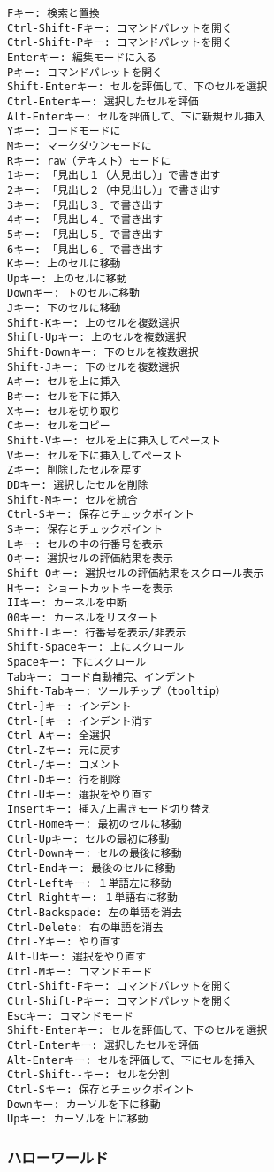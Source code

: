\documentclass[11pt]{article}
\begin{document}
    \begin{verbatim}
Fキー: 検索と置換
Ctrl-Shift-Fキー: コマンドパレットを開く
Ctrl-Shift-Pキー: コマンドパレットを開く
Enterキー: 編集モードに入る
Pキー: コマンドパレットを開く
Shift-Enterキー: セルを評価して、下のセルを選択
Ctrl-Enterキー: 選択したセルを評価
Alt-Enterキー: セルを評価して、下に新規セル挿入
Yキー: コードモードに
Mキー: マークダウンモードに
Rキー: raw（テキスト）モードに
1キー: 「見出し１（大見出し）」で書き出す
2キー: 「見出し２（中見出し）」で書き出す
3キー: 「見出し３」で書き出す
4キー: 「見出し４」で書き出す
5キー: 「見出し５」で書き出す
6キー: 「見出し６」で書き出す
Kキー: 上のセルに移動
Upキー: 上のセルに移動
Downキー: 下のセルに移動
Jキー: 下のセルに移動
Shift-Kキー: 上のセルを複数選択
Shift-Upキー: 上のセルを複数選択
Shift-Downキー: 下のセルを複数選択
Shift-Jキー: 下のセルを複数選択
Aキー: セルを上に挿入
Bキー: セルを下に挿入
Xキー: セルを切り取り
Cキー: セルをコピー
Shift-Vキー: セルを上に挿入してペースト
Vキー: セルを下に挿入してペースト
Zキー: 削除したセルを戻す
DDキー: 選択したセルを削除
Shift-Mキー: セルを統合
Ctrl-Sキー: 保存とチェックポイント
Sキー: 保存とチェックポイント
Lキー: セルの中の行番号を表示
Oキー: 選択セルの評価結果を表示
Shift-Oキー: 選択セルの評価結果をスクロール表示
Hキー: ショートカットキーを表示
IIキー: カーネルを中断
00キー: カーネルをリスタート
Shift-Lキー: 行番号を表示/非表示
Shift-Spaceキー: 上にスクロール
Spaceキー: 下にスクロール
Tabキー: コード自動補完、インデント
Shift-Tabキー: ツールチップ（tooltip）
Ctrl-]キー: インデント
Ctrl-[キー: インデント消す
Ctrl-Aキー: 全選択
Ctrl-Zキー: 元に戻す
Ctrl-/キー: コメント
Ctrl-Dキー: 行を削除
Ctrl-Uキー: 選択をやり直す
Insertキー: 挿入/上書きモード切り替え
Ctrl-Homeキー: 最初のセルに移動
Ctrl-Upキー: セルの最初に移動
Ctrl-Downキー: セルの最後に移動
Ctrl-Endキー: 最後のセルに移動
Ctrl-Leftキー: １単語左に移動
Ctrl-Rightキー: １単語右に移動
Ctrl-Backspade: 左の単語を消去
Ctrl-Delete: 右の単語を消去
Ctrl-Yキー: やり直す
Alt-Uキー: 選択をやり直す
Ctrl-Mキー: コマンドモード
Ctrl-Shift-Fキー: コマンドパレットを開く
Ctrl-Shift-Pキー: コマンドパレットを開く
Escキー: コマンドモード
Shift-Enterキー: セルを評価して、下のセルを選択
Ctrl-Enterキー: 選択したセルを評価
Alt-Enterキー: セルを評価して、下にセルを挿入
Ctrl-Shift--キー: セルを分割
Ctrl-Sキー: 保存とチェックポイント
Downキー: カーソルを下に移動
Upキー: カーソルを上に移動
\end{verbatim}

    \subsubsection{ハローワールド}\label{ux30cfux30edux30fcux30efux30fcux30ebux30c9}
\end{document}
